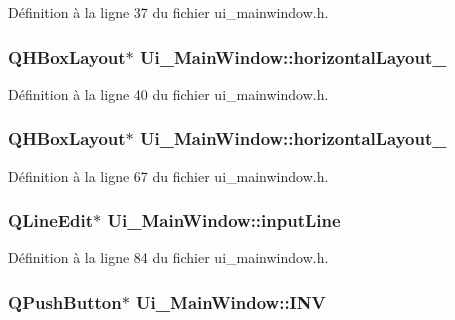 \-Définition à la ligne 37 du fichier ui\-\_\-mainwindow.\-h.

\hypertarget{class_ui___main_window_a80867018070156432923d0266cc9fe25}{
\subsubsection[{horizontal\-Layout\-\_\-2}]{\setlength{\rightskip}{0pt plus 5cm}\-Q\-H\-Box\-Layout$\ast$ {\bf \-Ui\-\_\-\-Main\-Window\-::horizontal\-Layout\-\_}}}\label{class_ui___main_window_a80867018070156432923d0266cc9fe25}


\-Définition à la ligne 40 du fichier ui\-\_\-mainwindow.\-h.

\hypertarget{class_ui___main_window_a03ce63974cc69b067c91bbf285cceca8}{
\subsubsection[{horizontal\-Layout\-\_\-3}]{\setlength{\rightskip}{0pt plus 5cm}\-Q\-H\-Box\-Layout$\ast$ {\bf \-Ui\-\_\-\-Main\-Window\-::horizontal\-Layout\-\_}}}\label{class_ui___main_window_a03ce63974cc69b067c91bbf285cceca8}


\-Définition à la ligne 67 du fichier ui\-\_\-mainwindow.\-h.

\hypertarget{class_ui___main_window_ade144a88c11ba1e7ef5e5e33036eea35}{
\subsubsection[{input\-Line}]{\setlength{\rightskip}{0pt plus 5cm}\-Q\-Line\-Edit$\ast$ {\bf \-Ui\-\_\-\-Main\-Window\-::input\-Line}}}\label{class_ui___main_window_ade144a88c11ba1e7ef5e5e33036eea35}


\-Définition à la ligne 84 du fichier ui\-\_\-mainwindow.\-h.

\hypertarget{class_ui___main_window_a8f44a583b70486ec7584db651ddc3fa6}{
\subsubsection[{\-I\-N\-V}]{\setlength{\rightskip}{0pt plus 5cm}\-Q\-Push\-Button$\ast$ {\bf \-Ui\-\_\-\-Main\-Window\-::\-I\-N\-V}}}\label{class_ui___main_window_a8f44a583b70486ec7584db651ddc3fa6}


